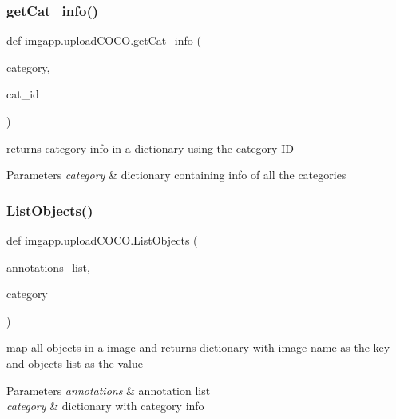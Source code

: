 \subsubsection{\texorpdfstring{get\+Cat\+\_\+info()}{getCat\_info()}}
{\footnotesize\ttfamily def imgapp.\+upload\+C\+O\+C\+O.\+get\+Cat\+\_\+info (\begin{DoxyParamCaption}\item[{}]{category,  }\item[{}]{cat\+\_\+id }\end{DoxyParamCaption})}



returns category info in a dictionary using the category ID 


\begin{DoxyParams}{Parameters}
{\em category} & dictionary containing info of all the categories \\
\hline
\end{DoxyParams}
\mbox{\label{namespaceimgapp_1_1uploadCOCO_ad068eaf76576fa93dc00dcd4082bed86}} 
\subsubsection{\texorpdfstring{List\+Objects()}{ListObjects()}}
{\footnotesize\ttfamily def imgapp.\+upload\+C\+O\+C\+O.\+List\+Objects (\begin{DoxyParamCaption}\item[{}]{annotations\+\_\+list,  }\item[{}]{category }\end{DoxyParamCaption})}



map all objects in a image and returns dictionary with image name as the key and objects list as the value 


\begin{DoxyParams}{Parameters}
{\em annotations} & annotation list \\
\hline
{\em category} & dictionary with category info \\
\hline
\end{DoxyParams}
\mbox{\label{namespaceimgapp_1_1uploadCOCO_a00079a30241831574eb416c09fef0bbc}} 
